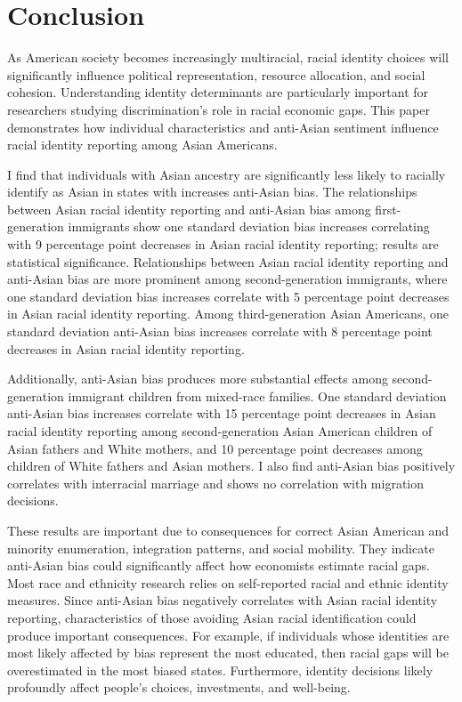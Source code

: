 \section{Conclusion}\label{sec:conc}

As American society becomes increasingly multiracial, racial identity choices will significantly influence political representation, resource allocation, and social cohesion. Understanding identity determinants are particularly important for researchers studying discrimination's role in racial economic gaps. This paper demonstrates how individual characteristics and anti-Asian sentiment influence racial identity reporting among Asian Americans.

I find that individuals with Asian ancestry are significantly less likely to racially identify as Asian in states with increases anti-Asian bias. The relationships between Asian racial identity reporting and anti-Asian bias among first-generation immigrants show one standard deviation bias increases correlating with 9 percentage point decreases in Asian racial identity reporting; results are statistical significance. Relationships between Asian racial identity reporting and anti-Asian bias are more prominent among second-generation immigrants, where one standard deviation bias increases correlate with 5 percentage point decreases in Asian racial identity reporting. Among third-generation Asian Americans, one standard deviation anti-Asian bias increases correlate with 8 percentage point decreases in Asian racial identity reporting.

Additionally, anti-Asian bias produces more substantial effects among second-generation immigrant children from mixed-race families. One standard deviation anti-Asian bias increases correlate with 15 percentage point decreases in Asian racial identity reporting among second-generation Asian American children of Asian fathers and White mothers, and 10 percentage point decreases among children of White fathers and Asian mothers. I also find anti-Asian bias positively correlates with interracial marriage and shows no correlation with migration decisions.

These results are important due to consequences for correct Asian American and minority enumeration, integration patterns, and social mobility. They indicate anti-Asian bias could significantly affect how economists estimate racial gaps. Most race and ethnicity research relies on self-reported racial and ethnic identity measures. Since anti-Asian bias negatively correlates with Asian racial identity reporting, characteristics of those avoiding Asian racial identification could produce important consequences. For example, if individuals whose identities are most likely affected by bias represent the most educated, then racial gaps will be overestimated in the most biased states. Furthermore, identity decisions likely profoundly affect people's choices, investments, and well-being.

